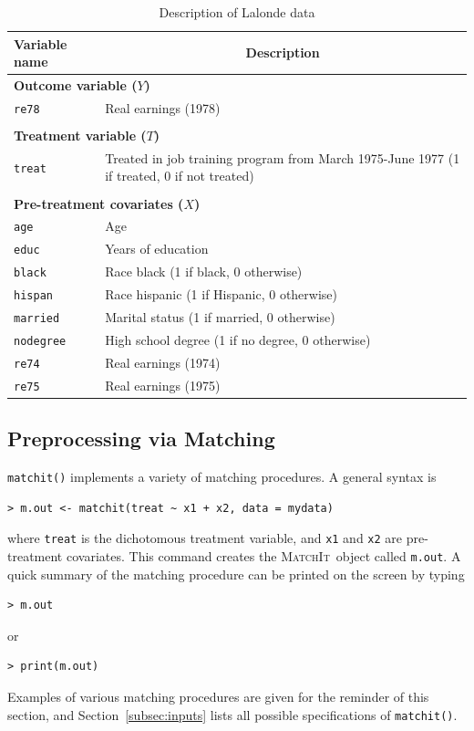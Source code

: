 \documentclass[oneside,letterpaper,titlepage]{article}
\newcommand{\MatchIt}{\textsc{MatchIt}}
\begin{document}
\begin{table}[h]
\centering
\begin{tabular}{lp{3in}}
  \hline 
  \multicolumn{1}{l}{Variable name} & \multicolumn{1}{c}{Description} \\
  \hline
  \multicolumn{2}{l}{\textbf{Outcome variable ($Y$)}} \\ 
  \texttt{re78} & Real earnings (1978) \\ \\
  \multicolumn{2}{l}{\textbf{Treatment variable ($T$)}} \\
  \texttt{treat} & Treated in job training program from March 1975-June
  1977 (1 if treated, 0 if not treated)
  \\ \\
  \multicolumn{2}{l}{\textbf{Pre-treatment covariates ($X$)}} \\
  \texttt{age} & Age\\
  \texttt{educ} & Years of education \\
  \texttt{black} & Race black (1 if black, 0 otherwise) \\
  \texttt{hispan} & Race hispanic  (1 if Hispanic, 0 otherwise) \\
  \texttt{married} & Marital status (1 if married, 0 otherwise) \\
  \texttt{nodegree} & High school degree (1 if no degree, 0 otherwise)\\
  \texttt{re74} & Real earnings (1974) \\
  \texttt{re75} & Real earnings (1975) \\ 
  \hline
\end{tabular}\label{lalonde}
\caption{Description of Lalonde data \label{dwvars}}
\end{table}



\subsection{Preprocessing via Matching}
\label{subsec:matching}

\texttt{matchit()} implements a variety of matching procedures.  A
general syntax is
\begin{verbatim}
> m.out <- matchit(treat ~ x1 + x2, data = mydata)
\end{verbatim}
where {\tt treat} is the dichotomous treatment variable, and {\tt x1}
and {\tt x2} are pre-treatment covariates.  This command creates the
\MatchIt\ object called \texttt{m.out}.  A quick summary of the
matching procedure can be printed on the screen by typing
\begin{verbatim}
> m.out
\end{verbatim}
or
\begin{verbatim}
> print(m.out)
\end{verbatim}
Examples of various matching procedures are given for the reminder of
this section, and Section~\ref{subsec:inputs} lists all possible
specifications of {\tt matchit()}.
\end{document}
